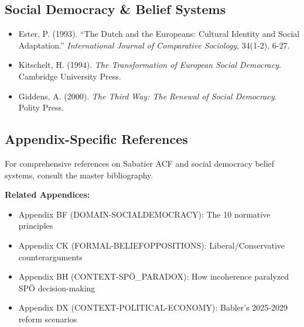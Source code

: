 \subsection{Social Democracy \& Belief Systems}

\begin{itemize}[nosep]
\item Ester, P. (1993). ``The Dutch and the Europeans: Cultural Identity and Social Adaptation.'' \textit{International Journal of Comparative Sociology}, 34(1-2), 6-27.

\item Kitschelt, H. (1994). \textit{The Transformation of European Social Democracy}. Cambridge University Press.

\item Giddens, A. (2000). \textit{The Third Way: The Renewal of Social Democracy}. Polity Press.

\end{itemize}

\nocite{bcm_master}

\subsection{Appendix-Specific References}

For comprehensive references on Sabatier ACF and social democracy belief systems, consult the master bibliography.


\begin{tcolorbox}[colback=orange!5!white, colframe=orange!75!black,
    title=Cross-Reference Links]

\textbf{Related Appendices:}
\begin{itemize}[nosep]
\item Appendix BF (DOMAIN-SOCIALDEMOCRACY): The 10 normative principles
\item Appendix CK (FORMAL-BELIEFOPPOSITIONS): Liberal/Conservative counterarguments
\item Appendix BH (CONTEXT-SPÖ_PARADOX): How incoherence paralyzed SPÖ decision-making
\item Appendix DX (CONTEXT-POLITICAL-ECONOMY): Babler's 2025-2029 reform scenarios
\end{itemize}

\end{tcolorbox}



